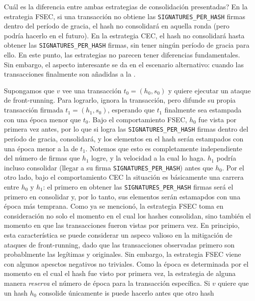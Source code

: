 Cuál es la diferencia entre ambas estrategias de consolidación presentadas?
%
En la estrategia FSEC, si una transacción no obtiene las \texttt{SIGNATURES\_PER\_HASH} firmas
dentro del período de gracia, el hash no consolidará en aquella ronda (pero podría hacerlo
en el futuro).
%
En la estrategia CEC, el hash no consolidará hasta obtener las \texttt{SIGNATURES\_PER\_HASH} firmas,
sin tener ningún período de gracia para ello.
%
En este punto, las estrategias no parecen tener diferencias fundamentales. Sin embargo, el aspecto
interesante se da en el escenario alternativo: cuando las transacciones finalmente son añadidas a la
\setchain.
%

Supongamos que $v$ vee una transacción $t_0 = (h_0, s_0)$ y quiere ejecutar un ataque de front-running.
Para lograrlo, ignora la transacción, pero difunde su propia transacción firmada $t_1 = (h_1, s_0)$,
esperando que $t_1$ finalmente sea estampada con una época menor que $t_0$.
%
Bajo el comportamiento FSEC, $h_0$ fue vista por primera vez antes, por lo que si logra las
\texttt{SIGNATURES\_PER\_HASH} firmas dentro del período de gracia, consolidará, y los elementos
en el hash serán estampados con una época menor a la de $t_1$.
%
Notemos que esto es completamente independiente del número de firmas que $h_1$ logre, y la velocidad
a la cual lo haga. $h_1$ podría incluso consolidar (llegar a su firma \texttt{SIGNATURES\_PER\_HASH})
antes que $h_0$.
%
Por el otro lado, bajo el comportamiento CEC la situación es básicamente una carrera entre $h_0$ y
$h_1$: el primero en obtener las \texttt{SIGNATURES\_PER\_HASH} firmas será el primero en consolidar y,
por lo tanto, sus elementos serán estamapdos con una época más temprana.
%
Como ya se mencionó, 
la estrategia FSEC toma en consideración no solo el momento en el cual los hashes consolidan, sino
también el momento en que las transacciones fueron vistas por primera vez.
%
En principio, esta característica se puede considerar un aspeco valioso en la mitigación de ataques
de front-running, dado que las transacciones observadas primero son probablmente las legítimas y
originales.
Sin embargo, la estrategia FSEC viene con algunos apesctos negativos no triviales.
%
Como la época es determinada por el momento en el cual el hash fue visto por primera vez, 
la estrategia de alguna manera \textit{reserva} el número de época para la transacción específica.
Si $v$ quiere que un hash $h_0$ consolide únicamente is puede hacerlo antes que otro hash
